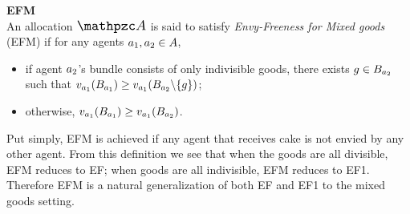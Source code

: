 \textbf{EFM}\\
An allocation $\sAllocation$ is said to satisfy \emph{Envy-Freeness for Mixed goods} (EFM) if for any agents $a_1,a_2 \in A$,
\begin{itemize}
    \item if agent $a_2$'s bundle consists of only indivisible goods, there exists $g \in B_{a_2}$ such that $v_{a_1}(B_{a_1}) \geq v_{a_1}(B_{a_2}\backslash \{g\})$;
    \item otherwise, $v_{a_1}(B_{a_1}) \geq v_{a_1}(B_{a_2})$.
\end{itemize}
Put simply, EFM is achieved if any agent that receives cake is not envied by any other agent.
From this definition we see that when the goods are all divisible, EFM reduces to EF; when goods are all indivisible, EFM reduces to EF1. Therefore EFM is a natural generalization of both EF and EF1 to the mixed goods setting.